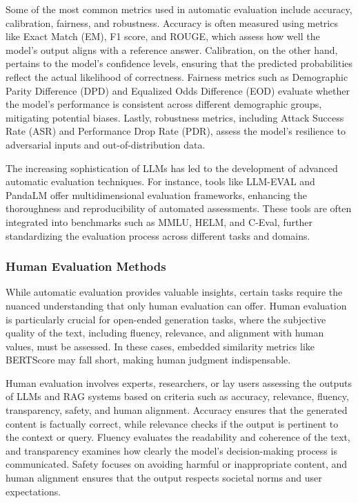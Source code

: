 Some of the most common metrics used in automatic evaluation include accuracy, calibration, fairness, and robustness. Accuracy is often measured using metrics like Exact Match (EM), F1 score, and ROUGE, which assess how well the model's output aligns with a reference answer. Calibration, on the other hand, pertains to the model’s confidence levels, ensuring that the predicted probabilities reflect the actual likelihood of correctness. Fairness metrics such as Demographic Parity Difference (DPD) and Equalized Odds Difference (EOD) evaluate whether the model's performance is consistent across different demographic groups, mitigating potential biases. Lastly, robustness metrics, including Attack Success Rate (ASR) and Performance Drop Rate (PDR), assess the model's resilience to adversarial inputs and out-of-distribution data.

The increasing sophistication of LLMs has led to the development of advanced automatic evaluation techniques. For instance, tools like LLM-EVAL and PandaLM offer multidimensional evaluation frameworks, enhancing the thoroughness and reproducibility of automated assessments. These tools are often integrated into benchmarks such as MMLU, HELM, and C-Eval, further standardizing the evaluation process across different tasks and domains.

\subsubsection{Human Evaluation Methods}

While automatic evaluation provides valuable insights, certain tasks require the nuanced understanding that only human evaluation can offer. Human evaluation is particularly crucial for open-ended generation tasks, where the subjective quality of the text, including fluency, relevance, and alignment with human values, must be assessed. In these cases, embedded similarity metrics like BERTScore may fall short, making human judgment indispensable.

Human evaluation involves experts, researchers, or lay users assessing the outputs of LLMs and RAG systems based on criteria such as accuracy, relevance, fluency, transparency, safety, and human alignment. Accuracy ensures that the generated content is factually correct, while relevance checks if the output is pertinent to the context or query. Fluency evaluates the readability and coherence of the text, and transparency examines how clearly the model’s decision-making process is communicated. Safety focuses on avoiding harmful or inappropriate content, and human alignment ensures that the output respects societal norms and user expectations.

